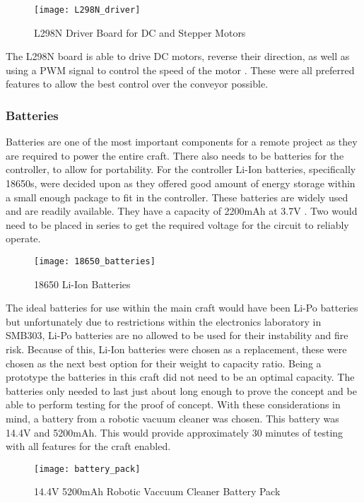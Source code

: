 \documentclass [12pt]{article}
\begin{document}
\begin{figure}[H]
\centerline{\texttt{[image: L298N\_driver]}}
\caption{L298N Driver Board for DC and Stepper Motors}
\label{fig:L298N_driver}
\end{figure}

The L298N board is able to drive DC motors, reverse their direction, as well as using a PWM signal to control the speed of the motor \citep{L298N}. These were all preferred features to allow the best control over the conveyor possible. 

\subsubsection{Batteries}

Batteries are one of the most important components for a remote project as they are required to power the entire craft. There also needs to be batteries for the controller, to allow for portability. For the controller Li-Ion batteries, specifically 18650s, were decided upon as they offered good amount of energy storage within a small enough package to fit in the controller. These batteries are widely used and are readily available. They have a capacity of 2200mAh at 3.7V \cite{18650}. Two would need to be placed in series to get the required voltage for the circuit to reliably operate. 

\begin{figure}[H]
\centerline{\texttt{[image: 18650\_batteries]}}
\caption{18650 Li-Ion Batteries}
\label{fig:18650_batteries}
\end{figure}

The ideal batteries for use within the main craft would have been Li-Po batteries but unfortunately due to restrictions within the electronics laboratory in SMB303, Li-Po batteries are no allowed to be used for their instability and fire risk. Because of this, Li-Ion batteries were chosen as a replacement, these were chosen as the next best option for their weight to capacity ratio. Being a prototype the batteries in this craft did not need to be an optimal capacity. The batteries only needed to last just about long enough to prove the concept and be able to perform testing for the proof of concept. With these considerations in mind, a battery from a robotic vacuum cleaner was chosen. This battery was 14.4V and 5200mAh. This would provide approximately 30 minutes of testing with all features for the craft enabled. 

\begin{figure}[H]
\centerline{\texttt{[image: battery\_pack]}}
\caption{14.4V 5200mAh Robotic Vaccuum Cleaner Battery Pack}
\label{fig:battery_pack}
\end{figure}
\end{document}
